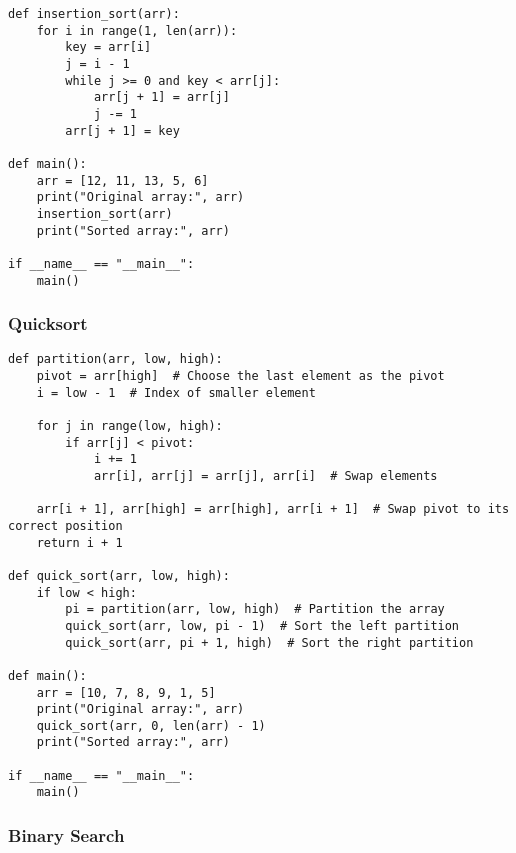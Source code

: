\documentclass[a4paper,12pt]{article}
\begin{document}
\begin{lstlisting}[style=pythonstyle, caption={Insertion Sort (Python)}]
def insertion_sort(arr):
    for i in range(1, len(arr)):
        key = arr[i]
        j = i - 1
        while j >= 0 and key < arr[j]:
            arr[j + 1] = arr[j]
            j -= 1
        arr[j + 1] = key

def main():
    arr = [12, 11, 13, 5, 6]
    print("Original array:", arr)
    insertion_sort(arr)
    print("Sorted array:", arr)

if __name__ == "__main__":
    main()
\end{lstlisting}

\newpage

\subsubsection{Quicksort}

\begin{lstlisting}[style=pythonstyle, caption={Quicksort Algorithm (Python)}]
def partition(arr, low, high):
    pivot = arr[high]  # Choose the last element as the pivot
    i = low - 1  # Index of smaller element

    for j in range(low, high):
        if arr[j] < pivot:
            i += 1
            arr[i], arr[j] = arr[j], arr[i]  # Swap elements

    arr[i + 1], arr[high] = arr[high], arr[i + 1]  # Swap pivot to its correct position
    return i + 1

def quick_sort(arr, low, high):
    if low < high:
        pi = partition(arr, low, high)  # Partition the array
        quick_sort(arr, low, pi - 1)  # Sort the left partition
        quick_sort(arr, pi + 1, high)  # Sort the right partition

def main():
    arr = [10, 7, 8, 9, 1, 5]
    print("Original array:", arr)
    quick_sort(arr, 0, len(arr) - 1)
    print("Sorted array:", arr)

if __name__ == "__main__":
    main()
\end{lstlisting}

\newpage

\subsubsection{Binary Search}
\end{document}

